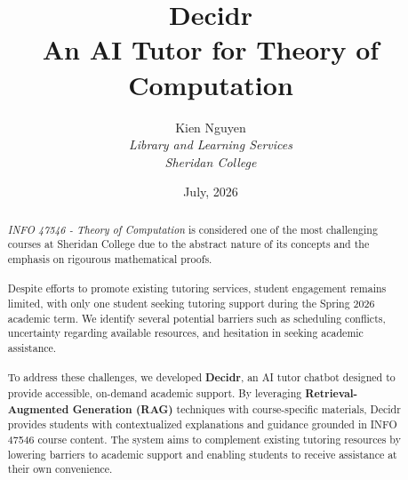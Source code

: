 \documentclass[12pt, a4paper]{report}
\title{\textbf{Decidr}\\ \large An AI Tutor for Theory of Computation}
\author{Kien Nguyen \\ \textit{Library and Learning Services} \\ \textit{Sheridan College}}
\date{July, 2026}
\begin{document}
\maketitle

\begin{abstract}
\noindent \textit{INFO 47546 - Theory of Computation} is considered one of the most challenging courses at Sheridan College due to the abstract nature of its concepts and the emphasis on rigourous mathematical proofs.~\\~\\
Despite efforts to promote existing tutoring services, student engagement remains limited, with only one student seeking tutoring support during the Spring 2026 academic term. We identify several potential barriers such as scheduling conflicts, uncertainty regarding available resources, and hesitation in seeking academic assistance.~\\~\\
To address these challenges, we developed \textbf{Decidr}, an AI tutor chatbot designed to provide accessible, on-demand academic support. By leveraging \textbf{Retrieval-Augmented Generation (RAG)} techniques with course-specific materials, Decidr provides students with contextualized explanations and guidance grounded in INFO 47546 course content. The system aims to complement existing tutoring resources by lowering barriers to academic support and enabling students to receive assistance at their own convenience.
\end{abstract}

\tableofcontents
\pagebreak

\end{document}
